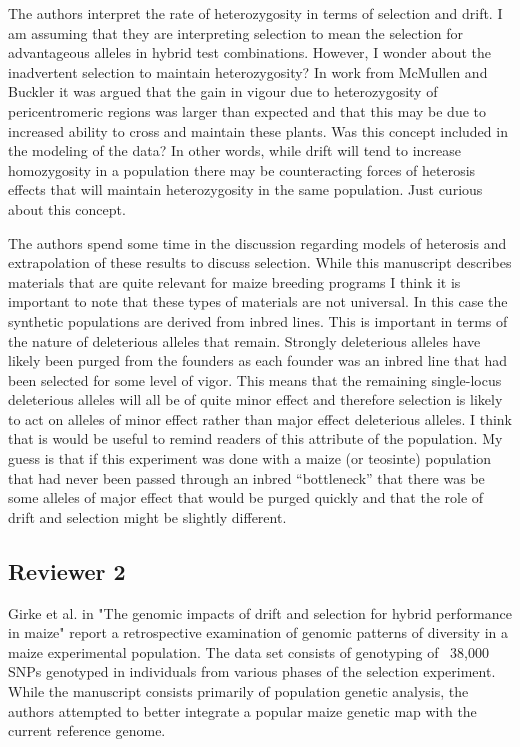 \documentclass[onecolumn,oneside,letterpaper]{article}
\begin{document}

The authors interpret the rate of heterozygosity in terms of selection and 
drift.  I am assuming that they are interpreting selection to mean the selection 
for advantageous alleles in hybrid test combinations.  However, I wonder about 
the inadvertent selection to maintain heterozygosity?  In work from McMullen and 
Buckler it was argued that the gain in vigour due to heterozygosity of 
pericentromeric regions was larger than expected and that this may be due to 
increased ability to cross and maintain these plants.  Was this concept included 
in the modeling of the data?  In other words, while drift will tend to increase 
homozygosity in a population there may be counteracting forces of heterosis 
effects that will maintain heterozygosity in the same population.  Just curious 
about this concept.


The authors spend some time in the discussion regarding models of heterosis and 
extrapolation of these results to discuss selection.  While this manuscript 
describes materials that are quite relevant for maize breeding programs I think 
it is important to note that these types of materials are not universal.  In 
this case the synthetic populations are derived from inbred lines.  This is 
important in terms of the nature of deleterious alleles that remain.  Strongly 
deleterious alleles have likely been purged from the founders as each founder 
was an inbred line that had been selected for some level of vigor.  This means 
that the remaining single-locus deleterious alleles will all be of quite minor 
effect and therefore selection is likely to act on alleles of minor effect 
rather than major effect deleterious alleles.  I think that is would be useful 
to remind readers of this attribute of the population.  My guess is that if this 
experiment was done with a maize (or teosinte) population that had never been 
passed through an inbred “bottleneck” that there was be some alleles of major 
effect that would be purged quickly and that the role of drift and selection 
might be slightly different.


\subsection*{Reviewer 2}
Girke et al. in "The genomic impacts of drift and selection for hybrid performance in maize" report a retrospective examination of genomic patterns of diversity in a maize experimental population. The data 
set consists of genotyping of ~38,000 SNPs genotyped in individuals from various phases of the selection 
experiment. While the manuscript consists primarily of population genetic analysis, the authors attempted 
to better integrate a popular maize genetic map with the current reference genome.
\end{document}
